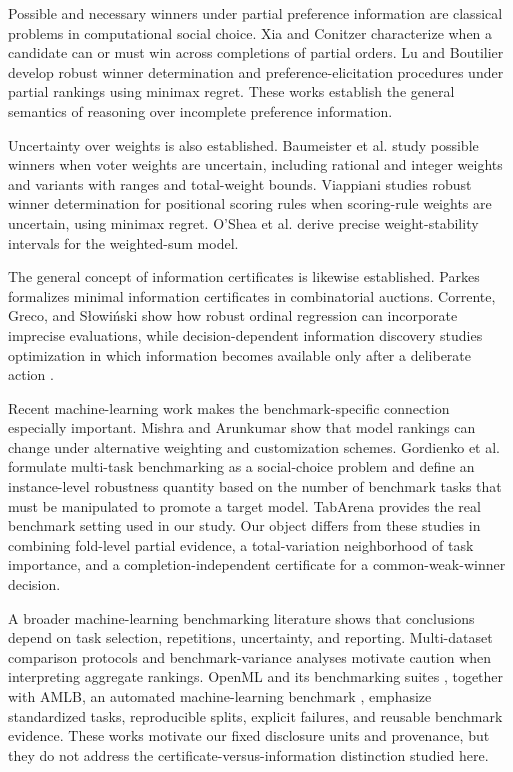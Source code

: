 \documentclass[preprint,11pt]{elsarticle}
\begin{document}
Possible and necessary winners under partial preference information are classical problems in computational social choice. Xia and Conitzer \cite{r2} characterize when a candidate can or must win across completions of partial orders. Lu and Boutilier \cite{r3} develop robust winner determination and preference-elicitation procedures under partial rankings using minimax regret. These works establish the general semantics of reasoning over incomplete preference information.

Uncertainty over weights is also established. Baumeister et al. \cite{r4} study possible winners when voter weights are uncertain, including rational and integer weights and variants with ranges and total-weight bounds. Viappiani \cite{r5} studies robust winner determination for positional scoring rules when scoring-rule weights are uncertain, using minimax regret. O'Shea et al. \cite{r6} derive precise weight-stability intervals for the weighted-sum model.

The general concept of information certificates is likewise established. Parkes \cite{r7} formalizes minimal information certificates in combinatorial auctions. Corrente, Greco, and S\l{}owi\'nski \cite{r8} show how robust ordinal regression can incorporate imprecise evaluations, while decision-dependent information discovery studies optimization in which information becomes available only after a deliberate action \cite{r9}.

Recent machine-learning work makes the benchmark-specific connection especially important. Mishra and Arunkumar \cite{r10} show that model rankings can change under alternative weighting and customization schemes. Gordienko et al. \cite{r11} formulate multi-task benchmarking as a social-choice problem and define an instance-level robustness quantity based on the number of benchmark tasks that must be manipulated to promote a target model. TabArena \cite{r12} provides the real benchmark setting used in our study. Our object differs from these studies in combining fold-level partial evidence, a total-variation neighborhood of task importance, and a completion-independent certificate for a common-weak-winner decision.

A broader machine-learning benchmarking literature shows that conclusions depend on task selection, repetitions, uncertainty, and reporting. Multi-dataset comparison protocols \cite{r13,r14} and benchmark-variance analyses \cite{r15} motivate caution when interpreting aggregate rankings. OpenML and its benchmarking suites \cite{r16,r17}, together with AMLB, an automated machine-learning benchmark \cite{r18}, emphasize standardized tasks, reproducible splits, explicit failures, and reusable benchmark evidence. These works motivate our fixed disclosure units and provenance, but they do not address the certificate-versus-information distinction studied here.
\end{document}
